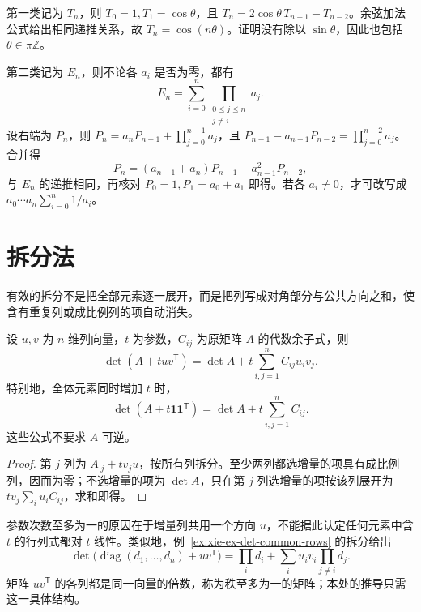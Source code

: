 \begin{solve}
第一类记为 $T_n$，则 $T_0=1,T_1=\cos\theta$，且 $T_n=2\cos\theta\,T_{n-1}-T_{n-2}$。余弦加法公式给出相同递推关系，故 $T_n=\cos(n\theta)$。证明没有除以 $\sin\theta$，因此也包括 $\theta\in\pi\mathbb Z$。

第二类记为 $E_n$，则不论各 $a_i$ 是否为零，都有
\begin{equation}
\label{eq:xie-ex-det-weighted-tridiagonal}
E_n=\sum_{i=0}^{n}\prod_{\substack{0\leq j\leq n\\j\ne i}}a_j.
\end{equation}
设右端为 $P_n$，则 $P_n=a_nP_{n-1}+\prod_{j=0}^{n-1}a_j$，且 $P_{n-1}-a_{n-1}P_{n-2}=\prod_{j=0}^{n-2}a_j$。合并得
\[
P_n=(a_{n-1}+a_n)P_{n-1}-a_{n-1}^2P_{n-2},
\]
与 $E_n$ 的递推相同，再核对 $P_0=1,P_1=a_0+a_1$ 即得。若各 $a_i\ne0$，才可改写成 $a_0\cdots a_n\sum_{i=0}^{n}1/a_i$。
\end{solve}

\section{拆分法}
\label{sec:xie-ex-det-splitting}

有效的拆分不是把全部元素逐一展开，而是把列写成对角部分与公共方向之和，使含有重复列或成比例列的项自动消失。

\begin{theorem}[公共方向的增量]
\label{thm:xie-ex-det-rank-one-update}
设 $u,v$ 为 $n$ 维列向量，$t$ 为参数，$C_{ij}$ 为原矩阵 $A$ 的代数余子式，则
\begin{equation}
\label{eq:xie-ex-det-rank-one-update}
\det(A+tuv^{\mathsf T})=\det A+t\sum_{i,j=1}^{n}C_{ij}u_iv_j.
\end{equation}
特别地，全体元素同时增加 $t$ 时，
\begin{equation}
\label{eq:xie-ex-det-all-increment}
\det(A+t\mathbf1\mathbf1^{\mathsf T})=\det A+t\sum_{i,j=1}^{n}C_{ij}.
\end{equation}
这些公式不要求 $A$ 可逆。
\end{theorem}

\begin{proof}
第 $j$ 列为 $A_{\cdot j}+tv_ju$，按所有列拆分。至少两列都选增量的项具有成比例列，因而为零；不选增量的项为 $\det A$，只在第 $j$ 列选增量的项按该列展开为 $tv_j\sum_i u_iC_{ij}$，求和即得。
\end{proof}

参数次数至多为一的原因在于增量列共用一个方向 $u$，不能据此认定任何元素中含 $t$ 的行列式都对 $t$ 线性。类似地，例~\ref{ex:xie-ex-det-common-rows} 的拆分给出
\begin{equation}
\label{eq:xie-ex-det-diagonal-rank-one}
\det\bigl(\operatorname{diag}(d_1,\ldots,d_n)+uv^{\mathsf T}\bigr)
=\prod_i d_i+\sum_i u_iv_i\prod_{j\ne i}d_j.
\end{equation}
矩阵 $uv^{\mathsf T}$ 的各列都是同一向量的倍数，称为秩至多为一的矩阵；本处的推导只需这一具体结构。


